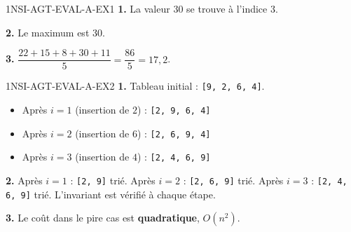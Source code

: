 \begin{corrige}{1NSI-AGT-EVAL-A-EX1}
\textbf{1.} La valeur $30$ se trouve à l'indice $3$.

\textbf{2.} Le maximum est $30$.

\textbf{3.} $\dfrac{22+15+8+30+11}{5}=\dfrac{86}{5}=17{,}2$.
\end{corrige}

\begin{corrige}{1NSI-AGT-EVAL-A-EX2}
\textbf{1.} Tableau initial : \lstinline{[9, 2, 6, 4]}.
\begin{itemize}
  \item Après $i=1$ (insertion de $2$) : \lstinline{[2, 9, 6, 4]}
  \item Après $i=2$ (insertion de $6$) : \lstinline{[2, 6, 9, 4]}
  \item Après $i=3$ (insertion de $4$) : \lstinline{[2, 4, 6, 9]}
\end{itemize}

\textbf{2.} Après $i=1$ : \lstinline{[2, 9]} trié. Après $i=2$ : \lstinline{[2, 6, 9]}
trié. Après $i=3$ : \lstinline{[2, 4, 6, 9]} trié. L'invariant est vérifié à chaque étape.

\textbf{3.} Le coût dans le pire cas est \textbf{quadratique}, $O(n^2)$.
\end{corrige}
